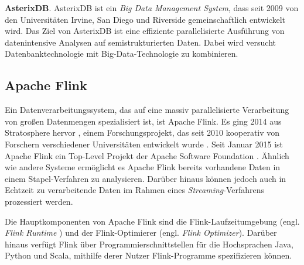 \textbf{AsterixDB}. AsterixDB ist ein \textit{Big Data Management System}, dass seit 2009 von den Universitäten Irvine, San Diego und Riverside gemeinschaftlich entwickelt wird. Das Ziel von AsterixDB ist eine effiziente parallelisierte Ausführung von datenintensive Analysen auf semistrukturierten Daten. Dabei wird versucht Datenbanktechnologie mit Big-Data-Technologie zu kombinieren.

\subsection{Apache Flink}
\label{sec:ApacheFlink}
Ein Datenverarbeitungssystem, das auf eine massiv parallelisierte Verarbeitung von großen Datenmengen spezialisiert ist, ist Apache Flink. Es ging 2014 aus Stratosphere hervor \cite{BraunWebsite}, einem Forschungsprojekt, das seit 2010 kooperativ von Forschern verschiedener Universitäten entwickelt wurde \cite{Battre2010, Alexandrov2014}. Seit Januar 2015 ist Apache Flink ein Top-Level Projekt der Apache Software Foundation \cite{ApacheFlinkBlogEntry}. 
Ähnlich wie andere Systeme ermöglicht es Apache Flink bereits vorhandene Daten in einem Stapel-Verfahren zu analysieren. Darüber hinaus können jedoch auch in Echtzeit zu verarbeitende Daten im Rahmen eines \textit{Streaming}-Verfahrens prozessiert werden. 

Die Hauptkomponenten von Apache Flink sind die Flink-Laufzeitumgebung (engl. \textit{Flink Runtime} ) und der Flink-Optimierer (engl. \textit{Flink Optimizer}). Darüber hinaus verfügt Flink über Programmierschnittstellen für die Hochsprachen Java, Python und Scala, mithilfe derer Nutzer Flink-Programme spezifizieren können. 

